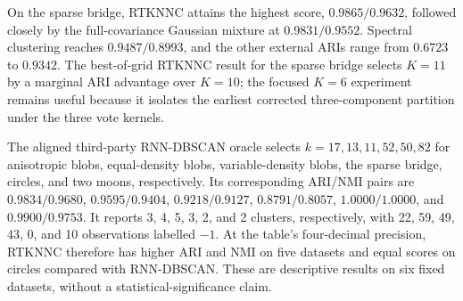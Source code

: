 \documentclass[pdflatex,sn-basic,Numbered]{sn-jnl}
\begin{document}
On the sparse bridge, RTKNNC attains the highest score,
$0.9865/0.9632$, followed closely by the full-covariance Gaussian mixture at
$0.9831/0.9552$.  Spectral clustering reaches $0.9487/0.8993$, and the other
external ARIs range from $0.6723$ to $0.9342$. The best-of-grid RTKNNC result
for the sparse bridge selects $K=11$ by a marginal ARI advantage over $K=10$;
the focused $K=6$ experiment remains useful because it isolates the earliest
corrected three-component partition under the three vote kernels.

The aligned third-party RNN-DBSCAN oracle selects $k=17,\allowbreak 13,\allowbreak 11,\allowbreak 52,\allowbreak 50,\allowbreak 82$ for
anisotropic blobs, equal-density blobs, variable-density blobs, the sparse
bridge, circles, and two moons, respectively. Its corresponding ARI/NMI pairs
are $0.9834/0.9680$, $0.9595/0.9404$, $0.9218/0.9127$,
$0.8791/0.8057$, $1.0000/1.0000$, and $0.9900/0.9753$.
It reports 3, 4, 5, 3, 2, and 2 clusters, respectively, with 22, 59, 49, 43,
0, and 10 observations labelled $-1$. At the table's four-decimal precision,
RTKNNC therefore has higher ARI and NMI on five datasets and equal scores on
circles compared with RNN-DBSCAN. These are descriptive results on six fixed
datasets, without a statistical-significance claim.
\end{document}
